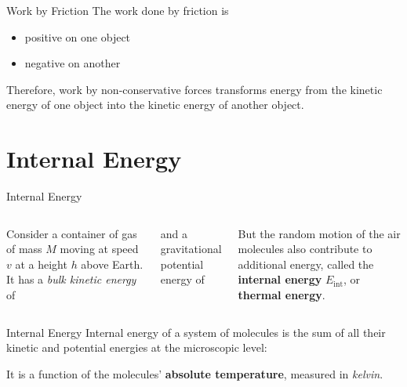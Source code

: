 \documentclass[12pt,compress,aspectratio=169]{beamer}
\begin{document}
\begin{frame}{Work by Friction}
  The work done by friction is
  \begin{itemize}
  \item positive on one object
  \item negative on another
  \end{itemize}
  Therefore, work by non-conservative forces transforms energy from the kinetic
  energy of one object into the kinetic energy of another object.
\end{frame}




\section{Internal Energy}

\begin{frame}{Internal Energy}
  \begin{columns}

    Consider a container of gas of mass $M$ moving at speed $v$ at a height $h$
    above Earth. It has a \emph{bulk kinetic energy} of

    
    and a gravitational potential energy of


    But the random motion of the air molecules also contribute to additional
    energy, called the \textbf{internal energy} $E_\text{int}$, or
    \textbf{thermal energy}.
  \end{columns}
\end{frame}



\begin{frame}{Internal Energy}
  Internal energy of a system of molecules is the sum of all their kinetic and
  potential energies at the microscopic level:


  It is a function of the molecules' \textbf{absolute temperature}, measured in
  \emph{kelvin}.
\end{frame}
\end{document}
